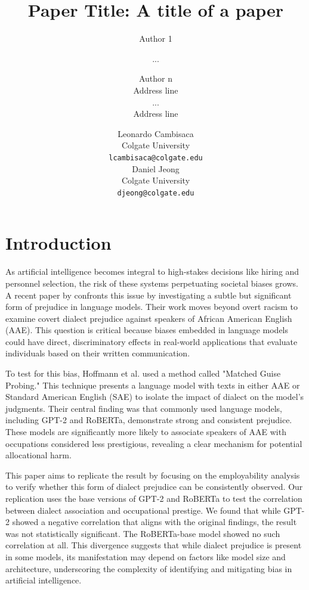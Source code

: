 \documentclass[11pt]{article}
\title{Paper Title: A title of a paper}
\author{Author 1 \and ... \and Author n \\
        Address line \\ ... \\ Address line}
\author{Leonardo Cambisaca \\
  Colgate University \\
  \texttt{lcambisaca@colgate.edu} \\
  \AND 
  Daniel Jeong \\
  Colgate University \\
  \texttt{djeong@colgate.edu} 
}
\begin{document}
\maketitle

\section{Introduction}

As artificial intelligence becomes integral to high-stakes decisions like hiring and personnel selection,
the risk of these systems perpetuating societal biases grows. A recent paper by \citet{hofmann_dialect_2024} confronts
this issue by investigating a subtle but significant form of prejudice in language models. Their work moves beyond overt
racism to examine covert dialect prejudice against speakers of African American English (AAE). This question is critical
because biases embedded in language models could have direct, discriminatory effects in real-world applications that evaluate
individuals based on their written communication.

To test for this bias, Hoffmann et al. used a method called "Matched Guise Probing."
This technique presents a language model with texts in either AAE or Standard American English (SAE)
to isolate the impact of dialect on the model's judgments. Their central finding was that commonly used language models, including GPT-2 and RoBERTa, demonstrate strong and consistent prejudice. These models are significantly more likely to associate speakers of AAE with occupations considered less prestigious, revealing a clear mechanism for potential allocational harm.

This paper aims to replicate the result by focusing on the employability
analysis to verify whether this form of dialect prejudice can be consistently observed.
Our replication uses the base versions of GPT-2 and RoBERTa to test the correlation between dialect association and occupational prestige. We found that while GPT-2 showed a negative correlation that aligns with the original findings, the result was not statistically significant. The RoBERTa-base model showed no such correlation at all. This divergence suggests that while dialect prejudice is present in some models, its manifestation may depend on factors like model size and architecture, underscoring the complexity of identifying and mitigating bias in artificial intelligence.
\end{document}
